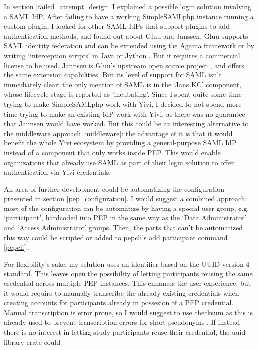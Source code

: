 \documentclass{report}
\begin{document}
In section \ref{failed_attempt_design} I explained a possible login solution involving a SAML IdP. After failing to have a working SimpleSAMLphp instance running a custom plugin, I
looked for other SAML IdPs that support plugins to add authentication methods, and found out about Gluu and Janssen. Gluu supports SAML identity federation \cite{gluu} and can be
extended using the Agama framework \cite{agama} or by writing \enquote*{interception scripts} in Java or Jython \cite{jython}. But it requires a commercial license to be used.
Jannsen is Gluu's upstream open source project \cite{janssen}, and offers the same extension capabilities. But its level of support for SAML isn't immediately clear: the only
mention of SAML is in the \enquote*{Jans KC} component, whose lifecycle stage is reported as \enquote*{incubating}. Since I spent quite some time trying to make SimpleSAMLphp work
with Yivi, I decided to not spend more time trying to make an existing IdP work with Yivi, as there was no guarantee that Jannsen would have worked. But this could be an
interesting alternative to the middleware approach \ref{middleware}: the advantage of it is that it would benefit the whole Yivi ecosystem by providing a general-purpose SAML IdP
instead of a component that only works inside PEP. This would enable organizations that already use SAML as part of their login solution to offer authentication via Yivi credentials.
\par
An area of further development could be automatizing the configuration presented in section \ref{pep_configuration}. I would suggest a combined approach: most of the configuration
can be automatize by having a special user group, e.g. \enquote*{participant}, hardcoded into PEP in the same way as the \enquote*{Data Administrator} and \enquote*{Access
Administrator} groups. Then, the parts that can't be automatized this way could be scripted or added to pepcli's add participant command \ref{pepcli}..\par For
flexibility's sake. my solution uses an identifier based on the UUID version 4 standard. This leaves open the possibility of letting participants reusing the same credential across
multiple PEP instances. This enhances the user experience, but it would require to manually transcribe the already existing credentials when creating accounts for participants
already in possesion of a PEP credential. Manual transcription is error prone, so I would suggest to use  checksum as this is already used to prevent transcription
errors for short pseudonyms \cite{pep-blueprint}. If instead there is no interest in letting study participants reuse their credential, the uuid library crate  could
\end{document}
